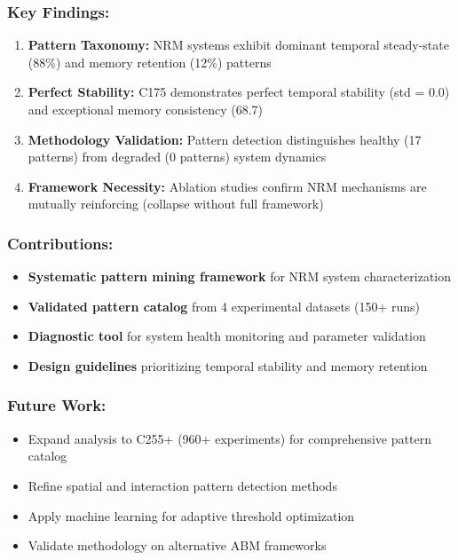 \documentclass[
]{article}
\providecommand{\tightlist}{%
  \setlength{\itemsep}{0pt}\setlength{\parskip}{0pt}}
\begin{document}
\subsubsection{Key Findings:}\label{key-findings}

\begin{enumerate}
\def\labelenumi{\arabic{enumi}.}
\tightlist
\item
  \textbf{Pattern Taxonomy:} NRM systems exhibit dominant temporal
  steady-state (88\%) and memory retention (12\%) patterns
\item
  \textbf{Perfect Stability:} C175 demonstrates perfect temporal
  stability (std = 0.0) and exceptional memory consistency (68.7)
\item
  \textbf{Methodology Validation:} Pattern detection distinguishes
  healthy (17 patterns) from degraded (0 patterns) system dynamics
\item
  \textbf{Framework Necessity:} Ablation studies confirm NRM mechanisms
  are mutually reinforcing (collapse without full framework)
\end{enumerate}

\subsubsection{Contributions:}\label{contributions-1}

\begin{itemize}
\tightlist
\item
  \textbf{Systematic pattern mining framework} for NRM system
  characterization
\item
  \textbf{Validated pattern catalog} from 4 experimental datasets (150+
  runs)
\item
  \textbf{Diagnostic tool} for system health monitoring and parameter
  validation
\item
  \textbf{Design guidelines} prioritizing temporal stability and memory
  retention
\end{itemize}

\subsubsection{Future Work:}\label{future-work}

\begin{itemize}
\tightlist
\item
  Expand analysis to C255+ (960+ experiments) for comprehensive pattern
  catalog
\item
  Refine spatial and interaction pattern detection methods
\item
  Apply machine learning for adaptive threshold optimization
\item
  Validate methodology on alternative ABM frameworks
\end{itemize}
\end{document}
